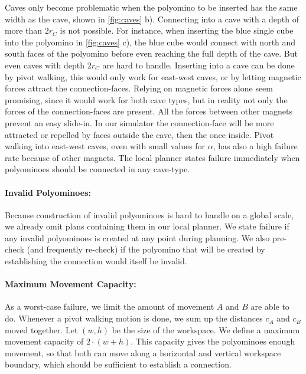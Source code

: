 Caves only become problematic when the polyomino to be inserted has the same width as the cave, shown in \autoref{fig:caves} b).
Connecting into a cave with a depth of more than $2 r_C$ is not possible.
For instance, when inserting the blue single cube into the polyomino in \autoref{fig:caves} c), the blue cube would connect with north and south faces of the polyomino before even reaching the full depth of the cave.
But even caves with depth $2 r_C$ are hard to handle.
Inserting into a cave can be done by pivot walking, this would only work for east-west caves, or by letting magnetic forces attract the connection-faces.
Relying on magnetic forces alone seem promising, since it would work for both cave types, but in reality not only the forces of the connection-faces are present.
All the forces between other magnets prevent an easy slide-in.
In our simulator the connection-face will be more attracted or repelled by faces outside the cave, then the once inside.
Pivot walking into east-west caves, even with small values for $\alpha$, has also a high failure rate because of other magnets.
The local planner states failure immediately when polyominoes should be connected in any cave-type.

\paragraph{Invalid Polyominoes:}

Because construction of invalid polyominoes is hard to handle on a global scale, we already omit plans containing them in our local planner.
We state failure if any invalid polyominoes is created at any point during planning.
We also pre-check (and frequently re-check) if the polyomino that will be created by establishing the connection would itself be invalid. 

\paragraph{Maximum Movement Capacity:}

As a worst-case failure, we limit the amount of movement $A$ and $B$ are able to do.
Whenever a pivot walking motion is done, we sum up the distances $c_A$ and $c_B$ moved together.
Let $(w,h)$ be the size of the workspace.
We define a maximum movement capacity of $2\cdot(w+h)$.
This capacity gives the polyominoes enough movement, so that both can move along a horizontal and vertical workspace boundary, which should be sufficient to establish a connection.

